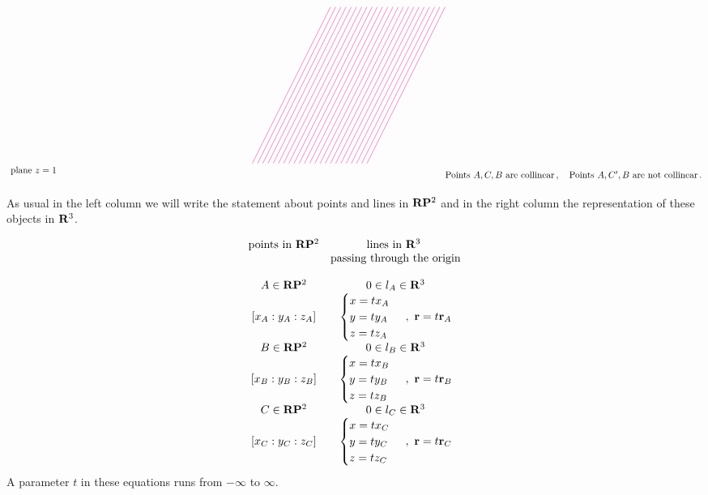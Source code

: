 \documentclass[12pt]{article}
\numberwithin{equation}{section}
\begin{document}
\begin{equation}
\begin{tikzpicture}
\draw [   magenta, thin] (-0.6,-2)--(2.4,4);
\draw [   magenta, thin] (-0.4,-2)--(2.6,4);
\draw [   magenta, thin] (-0.2,-2)--(2.8,4);
\draw [   magenta, thin] (0.0,-2)--(3.0,4);
\draw [   magenta, thin] (0.2,-2)--(3.2,4);
\draw [   magenta, thin] (0.4,-2)--(3.4,4);
\draw [   magenta, thin] (0.6,-2)--(3.6,4);
\draw [   magenta, thin] (0.8,-2)--(3.8,4);
\draw [   magenta, thin] (1.0,-2)--(4,4);
\draw [   magenta, thin] (1.2,-2)--(4.2,4);
\draw [   magenta, thin] (1.4,-2)--(4.4,4);
\draw [   magenta, thin] (1.6,-2)--(4.6,4);
\draw [   magenta, thin] (1.8,-2)--(4.8,4);
\draw [   magenta, thin] (2.0,-2)--(5,4);
\draw [   magenta, thin] (2.2,-2)--(5.2,4);
\draw [   magenta, thin] (2.4,-2)--(5.4,4);
\draw [   magenta, thin] (2.6,-2)--(5.6,4);
\draw [   magenta, thin] (2.8,-2)--(5.8,4);
\draw [   magenta, thin] (3.0,-2)--(6.0,4);
\draw [   magenta, thin] (3.2,-2)--(6.2,4);
\draw [   magenta, thin] (3.4,-2)--(6.4,4);
\draw [   magenta, thin] (3.6,-2)--(6.6,4);
\draw [   magenta, thin] (3.8,-2)--(6.8,4);


\node [below] at (-9,-2) {${{\rm plane}\,\, z=1}$};


\end{tikzpicture}
\hbox {Points $A,C,B$ are collinear}\,,\quad
\hbox {Points $A,C',B$ are not collinear}\,.
\end{equation}

As usual in the left column we will  write the statement about points
and lines in ${\bf R}{\bf P}^2$ and in the right column the representation
of these objects in ${\bf R}^3$.


             \begin{equation*}
            \begin{matrix}
   \hbox {points in ${\bf R}{\bf P}^2$}   & \hbox {lines in 
                    ${\bf R}^3$ }\cr
                          & \hbox {passing through the origin} \cr
                      \cr 
      A\in {\bf R}{\bf P}^2           & 0\in l_{A}\in {\bf R}^3\cr
  [x_A:y_A:z_A]            & \begin{cases} x=tx_A\cr y=ty_A\cr
                                        z=tz_A\end{cases}\,,\,\,
                              {\bf r}=t{\bf r}_A
                                       \cr             
       B\in {\bf R}{\bf P}^2           & 0\in l_{B}\in {\bf R}^3\cr
  [x_B:y_B:z_B]            & \begin{cases} x=tx_B\cr y=ty_B\cr
                                        z=tz_B\end{cases}\,,\,\,
                               {\bf r}=t{\bf r}_B
                             \cr             
        C\in {\bf R}{\bf P}^2           & 0\in l_{C}\in {\bf R}^3\cr
  [x_C:y_C:z_C]            & \begin{cases} x=tx_C\cr y=ty_C\cr
                                        z=tz_C\end{cases}\,,\,\,
                                  {\bf r}=t{\bf r}_C
                             \cr             
            \end{matrix}
              \end{equation*}
A parameter $t$ in these equations runs from $-\infty$ to $\infty$.
\end{document}
